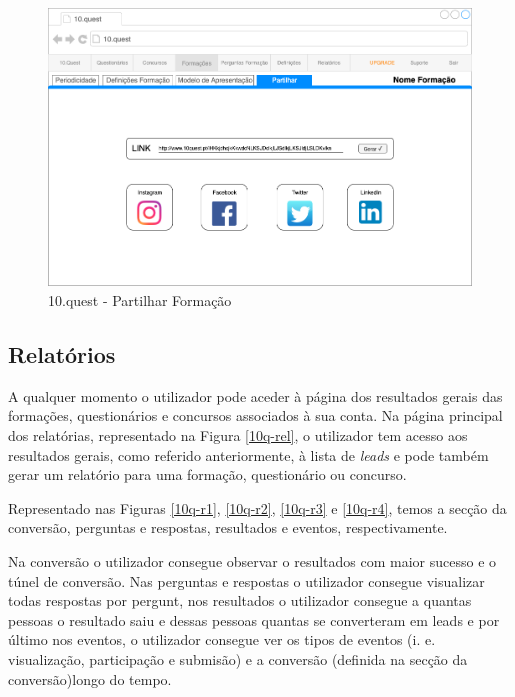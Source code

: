 \begin{figure}[ht!]
	\begin{center}
		\includegraphics[width=1\textwidth]{img/prototipos/12.png}
		\caption{10.quest - Partilhar Formação}
		\label{10q-}
	\end{center}
\end{figure}


\newpage

\subsection{Relatórios}

A qualquer momento o utilizador pode aceder à página dos resultados gerais das formações, questionários e concursos associados à sua conta. Na página principal dos relatórias, representado na Figura \ref{10q-rel}, o utilizador tem acesso aos resultados gerais, como referido anteriormente, à lista de \textit{leads} e pode também gerar um relatório para uma formação, questionário ou concurso.

Representado nas Figuras \ref{10q-r1}, \ref{10q-r2}, \ref{10q-r3} e \ref{10q-r4}, temos a secção da conversão, perguntas e respostas, resultados e eventos, respectivamente. 

Na conversão o utilizador consegue observar o resultados com maior sucesso e o túnel de conversão. Nas perguntas e respostas o utilizador consegue visualizar todas respostas por pergunt, nos resultados o utilizador consegue a quantas pessoas o resultado saiu e dessas pessoas quantas se converteram em leads e por último nos eventos, o utilizador consegue ver os tipos de eventos (i. e. visualização, participação e submisão) e a conversão (definida na secção da conversão)longo do tempo.

